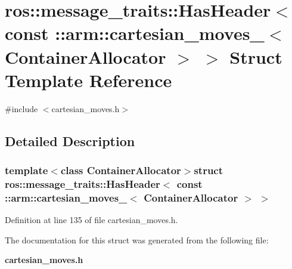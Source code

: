 \section{ros\-:\-:message\-\_\-traits\-:\-:\-Has\-Header$<$ const \-:\-:arm\-:\-:cartesian\-\_\-moves\-\_\-$<$ \-Container\-Allocator $>$ $>$ \-Struct \-Template \-Reference}
\label{structros_1_1message__traits_1_1HasHeader_3_01const_01_1_1arm_1_1cartesian__moves___3_01ContainerAllocator_01_4_01_4}


{\ttfamily \#include $<$cartesian\-\_\-moves.\-h$>$}



\subsection{\-Detailed \-Description}
\subsubsection*{template$<$class Container\-Allocator$>$struct ros\-::message\-\_\-traits\-::\-Has\-Header$<$ const \-::arm\-::cartesian\-\_\-moves\-\_\-$<$ Container\-Allocator $>$ $>$}



\-Definition at line 135 of file cartesian\-\_\-moves.\-h.



\-The documentation for this struct was generated from the following file\-:\begin{DoxyCompactItemize}
\item 
{\bf cartesian\-\_\-moves.\-h}\end{DoxyCompactItemize}
